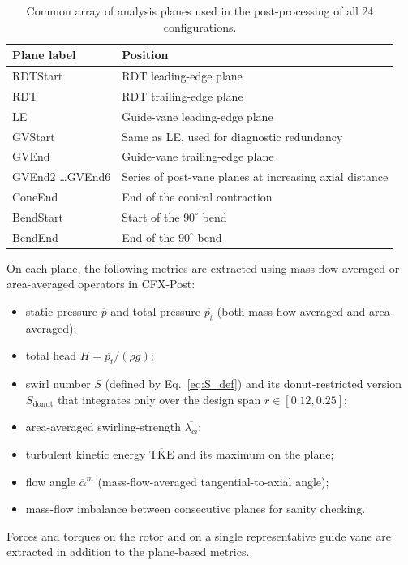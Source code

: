 \begin{table}[h!]
  \centering
  \caption[Analysis planes]{Common array of analysis planes used in the post-processing of all 24 configurations.}
  \label{tab:planes}
  \small
  \begin{tabular}{l|l}
    \toprule
    \textbf{Plane label} & \textbf{Position} \\
    \midrule
    RDTStart   & RDT leading-edge plane \\
    RDT        & RDT trailing-edge plane \\
    LE         & Guide-vane leading-edge plane \\
    GVStart    & Same as LE, used for diagnostic redundancy \\
    GVEnd      & Guide-vane trailing-edge plane \\
    GVEnd2 \dots GVEnd6 & Series of post-vane planes at increasing axial distance \\
    ConeEnd    & End of the conical contraction \\
    BendStart  & Start of the $90^\circ$ bend \\
    BendEnd    & End of the $90^\circ$ bend \\
    \bottomrule
  \end{tabular}
\end{table}
 
On each plane, the following metrics are extracted using mass-flow-averaged or area-averaged operators in CFX-Post:
\begin{itemize}
  \item static pressure $\overline{p}$ and total pressure $\overline{p_t}$ (both mass-flow-averaged and area-averaged);
  \item total head $H = \overline{p_t}/(\rho g)$;
  \item swirl number $S$ (defined by Eq.~\ref{eq:S_def}) and its donut-restricted version $S_{\mathrm{donut}}$ that integrates only over the design span $r \in [0.12, 0.25]$;
  \item area-averaged swirling-strength $\overline{\lambda_{ci}}$;
  \item turbulent kinetic energy $\overline{\mathrm{TKE}}$ and its maximum on the plane;
  \item flow angle $\overline{\alpha}^{m}$ (mass-flow-averaged tangential-to-axial angle);
  \item mass-flow imbalance between consecutive planes for sanity checking.
\end{itemize}
Forces and torques on the rotor and on a single representative guide vane are extracted in addition to the plane-based metrics.
 
